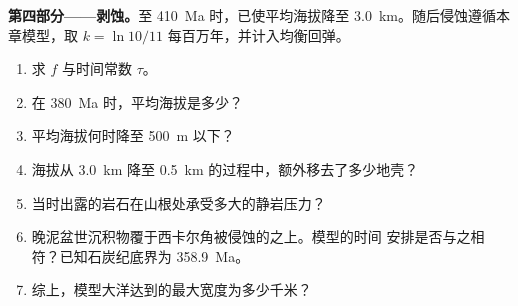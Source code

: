 \begin{problem}
\noindent\textbf{第四部分——剥蚀。}至 \qty{410}{Ma} 时，已使平均海拔降至
\qty{3.0}{km}。随后侵蚀遵循本章模型，取 $k = \ln
10/11$ 每百万年，并计入均衡回弹。
\begin{enumerate}[resume]
\item 求 $f$ 与时间常数 $\tau$。
\item 在 \qty{380}{Ma} 时，平均海拔是多少？
\item 平均海拔何时降至 \qty{500}{m} 以下？
\item 海拔从 \qty{3.0}{km} 降至 \qty{0.5}{km} 的过程中，额外移去了多少地壳？
\item 当时出露的岩石在山根处承受多大的静岩压力？
\item 晚泥盆世沉积物覆于西卡尔角被侵蚀的之上。模型的时间
安排是否与之相符？已知石炭纪底界为 \qty{358.9}{Ma}。
\item 综上，模型大洋达到的最大宽度为多少千米？
\end{enumerate}
\end{problem}
